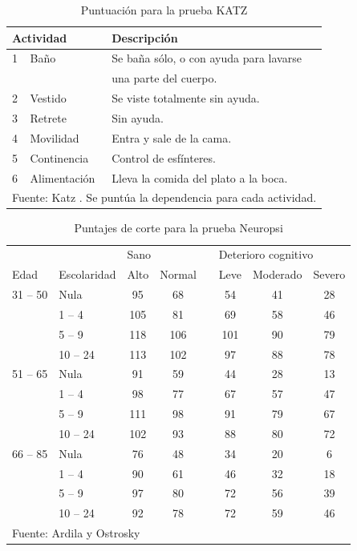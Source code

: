 \documentclass[12pt,letterpaper]{book}
\begin{document}
\begin{table}
\centering
\caption{Puntuación para la prueba KATZ}
\begin{tabular}{lll}
\toprule
\multicolumn{2}{l}{Actividad} & Descripción \\
\midrule
1 & Baño           & Se baña sólo, o con ayuda para lavarse \\
			      && una parte del cuerpo.\\
2 & Vestido        & Se viste totalmente sin ayuda.\\
3 & Retrete        & Sin ayuda.\\
4 & Movilidad      & Entra y sale de la cama.\\
5 & Continencia    & Control de esfínteres.\\
6 & Alimentación   & Lleva la comida del plato a la boca. \\
\bottomrule
\multicolumn{3}{l}{Fuente: Katz \cite{katz70}. Se puntúa la dependencia para cada actividad.}
\end{tabular}
\label{anexo:katz}
\end{table}

\begin{table}
\centering
\caption{Puntajes de corte para la prueba Neuropsi}
\begin{tabular}{llccrccc}
\toprule
&& \multicolumn{2}{l}{Sano} & \phantom{.} & \multicolumn{3}{l}{Deterioro cognitivo} \\
\cmidrule{3-4} \cmidrule{6-8} 
Edad & Escolaridad & Alto & Normal && Leve & Moderado & Severo\\
\midrule
31 -- 50  
& Nula     & 95  & 68  &  & 54  & 41 & 28 \\
& 1 -- 4   & 105 & 81  &  & 69  & 58 & 46 \\
& 5 -- 9   & 118 & 106 &  & 101 & 90 & 79 \\
& 10 -- 24 & 113 & 102 &  & 97  & 88 & 78 \\
\midrule
51 -- 65  
& Nula     & 91  & 59  &  & 44  & 28 & 13 \\
& 1 -- 4   & 98  & 77  &  & 67  & 57 & 47 \\
& 5 -- 9   & 111 & 98  &  & 91  & 79 & 67 \\
& 10 -- 24 & 102 & 93  &  & 88  & 80 & 72 \\
\midrule
66 -- 85  
& Nula     & 76  & 48  &  & 34  & 20 & 6 \\
& 1 -- 4   & 90  & 61  &  & 46  & 32 & 18 \\
& 5 -- 9   & 97  & 80  &  & 72  & 56 & 39 \\
& 10 -- 24 & 92  & 78  &  & 72  & 59 & 46 \\
\bottomrule
\multicolumn{7}{l}{Fuente: Ardila y Ostrosky \cite{Ardila12}}
\end{tabular}
\label{anexo:neuropsi}
\end{table}
\end{document}
